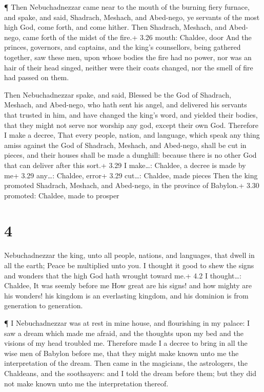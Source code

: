  ¶ Then Nebuchadnezzar came near to the mouth of the
burning fiery furnace, and spake, and said, Shadrach, Meshach, and
Abed-nego, ye servants of the most high God, come forth, and come
hither. Then Shadrach, Meshach, and Abed-nego, came forth of the midst
of the fire.+ 3.26 mouth: Chaldee, door  And the princes,
governors, and captains, and the king's counsellors, being gathered
together, saw these men, upon whose bodies the fire had no power, nor
was an hair of their head singed, neither were their coats changed, nor
the smell of fire had passed on them.

 Then Nebuchadnezzar spake, and said, Blessed be the God of
Shadrach, Meshach, and Abed-nego, who hath sent his angel, and delivered
his servants that trusted in him, and have changed the king's word, and
yielded their bodies, that they might not serve nor worship any god,
except their own God.  Therefore I make a decree, That
every people, nation, and language, which speak any thing amiss against
the God of Shadrach, Meshach, and Abed-nego, shall be cut in pieces, and
their houses shall be made a dunghill: because there is no other God
that can deliver after this sort.+ 3.29 I make\ldots: Chaldee, a decree
is made by me+ 3.29 any\ldots: Chaldee, error+ 3.29 cut\ldots: Chaldee,
made pieces  Then the king promoted Shadrach, Meshach, and
Abed-nego, in the province of Babylon.+ 3.30 promoted: Chaldee, made to
prosper

\hypertarget{section-3}{%
\section{4}\label{section-3}}

 Nebuchadnezzar the king, unto all people, nations, and
languages, that dwell in all the earth; Peace be multiplied unto you.
 I thought it good to shew the signs and wonders that the
high God hath wrought toward me.+ 4.2 I thought\ldots: Chaldee, It was
seemly before me  How great are his signs! and how mighty
are his wonders! his kingdom is an everlasting kingdom, and his dominion
is from generation to generation.

 ¶ I Nebuchadnezzar was at rest in mine house, and
flourishing in my palace:  I saw a dream which made me
afraid, and the thoughts upon my bed and the visions of my head troubled
me.  Therefore made I a decree to bring in all the wise men
of Babylon before me, that they might make known unto me the
interpretation of the dream.  Then came in the magicians,
the astrologers, the Chaldeans, and the soothsayers: and I told the
dream before them; but they did not make known unto me the
interpretation thereof.

